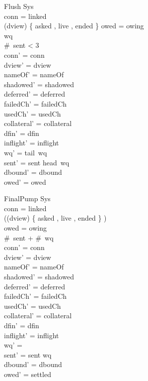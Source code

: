 \documentclass[a4paper,10pt,fleqn]{article}
\begin{document}
\begin{schema}{Flush}
  \Delta Sys \\
\where
  conn = linked \\
  (\ran dview) \cap \{ asked , live , ended \} \neq \emptyset \lor owed = owing \\
  wq \neq \langle \rangle \\
  \#~sent < 3 \\
  conn' = conn \\
  dview' = dview \\
  nameOf' = nameOf \\
  shadowed' = shadowed \\
  deferred' = deferred \\
  failedCh' = failedCh \\
  usedCh' = usedCh \\
  collateral' = collateral \\
  dfin' = dfin \\
  inflight' = inflight \\
  wq' = tail~wq \\
  sent' = sent \cat \langle head~wq \rangle \\
  dbound' = dbound \\
  owed' = owed
\end{schema}

\begin{schema}{FinalPump}
  \Delta Sys \\
\where
  conn = linked \\
  \lnot ((\ran dview) \cap \{ asked , live , ended \} \neq \emptyset) \\
  owed = owing \\
  \#~sent + \#~wq  \\
  conn' = conn \\
  dview' = dview \\
  nameOf' = nameOf \\
  shadowed' = shadowed \\
  deferred' = deferred \\
  failedCh' = failedCh \\
  usedCh' = usedCh \\
  collateral' = collateral \\
  dfin' = dfin \\
  inflight' = inflight \\
  wq' = \langle \rangle \\
  sent' = sent \cat wq \\
  dbound' = dbound \\
  owed' = settled
\end{schema}
\end{document}
